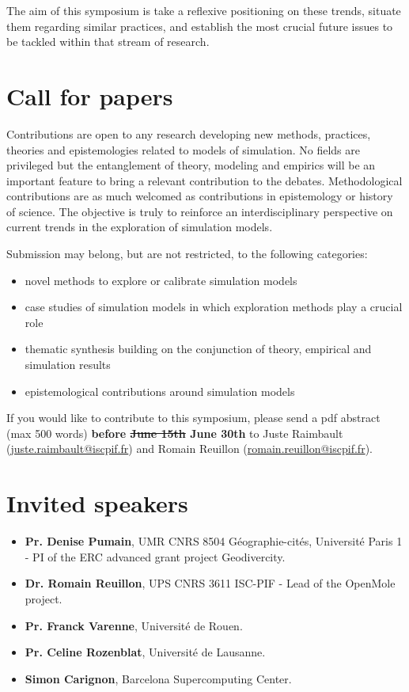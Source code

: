 \documentclass[11pt]{article}
\begin{document}
\medskip

The aim of this symposium is take a reflexive positioning on these trends, situate them regarding similar practices, and establish the most crucial future issues to be tackled within that stream of research.

\section*{Call for papers}

Contributions are open to any research developing new methods, practices, theories and epistemologies related to models of simulation. No fields are privileged but the entanglement of theory, modeling and empirics will be an important feature to bring a relevant contribution to the debates. Methodological contributions are as much welcomed as contributions in epistemology or history of science. The objective is truly to reinforce an interdisciplinary perspective on current trends in the exploration of simulation models.

\medskip

Submission may belong, but are not restricted, to the following categories:
\begin{itemize}
	\item novel methods to explore or calibrate simulation models
	\item case studies of simulation models in which exploration methods play a crucial role
	\item thematic synthesis building on the conjunction of theory, empirical and simulation results
	\item epistemological contributions around simulation models
\end{itemize}

\medskip
    
    
If you would like to contribute to this symposium, please send a pdf abstract (max 500 words) \textbf{before \sout{June 15th} June 30th} to Juste Raimbault (\href{mailto:juste.raimbault@iscpif.fr}{juste.raimbault@iscpif.fr}) and Romain Reuillon (\href{mailto:romain.reuillon@iscpif.fr}{romain.reuillon@iscpif.fr}). 
    


\section*{Invited speakers}

\begin{itemize}
    \item \textbf{Pr. Denise Pumain}, UMR CNRS 8504 Géographie-cités, Université Paris 1 - PI of the ERC advanced grant project Geodivercity.
    \item \textbf{Dr. Romain Reuillon}, UPS CNRS 3611 ISC-PIF - Lead of the OpenMole project.
    \item \textbf{Pr. Franck Varenne}, Université de Rouen.
    \item \textbf{Pr. Celine Rozenblat}, Université de Lausanne.
    \item \textbf{Simon Carignon}, Barcelona Supercomputing Center.
\end{itemize}
\end{document}
